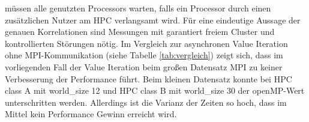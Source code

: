 müssen alle genutzten Processors warten, falls ein Processor durch einen zusätzlichen Nutzer am HPC verlangsamt wird.
Für eine eindeutige Aussage der genauen Korrelationen sind Messungen mit garantiert freiem Cluster und kontrollierten Störungen nötig.
Im Vergleich zur asynchronen Value Iteration ohne MPI-Kommunikation (siehe Tabelle \ref{tab:vergleich}) zeigt sich, dass im vorliegenden Fall der Value Iteration beim großen Datensatz MPI zu keiner Verbesserung der
Performance führt.
Beim kleinen Datensatz konnte bei HPC class A mit world\_size 12 und HPC class B mit world\_size 30 der openMP-Wert unterschritten werden.
Allerdings ist die Varianz der Zeiten so hoch, dass im Mittel kein Performance Gewinn erreicht wird.

\begin{table}[h]
\caption{Vergleich der runtime von openMP und MPI}
\end{table}